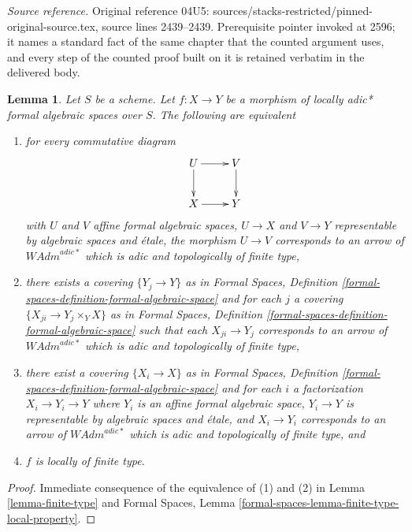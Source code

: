 \documentclass[10pt,a4paper]{amsart}
\theoremstyle{plain}
\newtheorem{lemma}[subsection]{Lemma}
\theoremstyle{definition}
\theoremstyle{remark}
\numberwithin{equation}{subsection}
\begin{document}
\noindent\textit{Source reference.} Original reference 04U5: sources/stacks-restricted/pinned-original-source.tex, source lines 2439--2439. Prerequisite pointer invoked at 2596; it names a standard fact of the same chapter that the counted argument uses, and every step of the counted proof built on it is retained verbatim in the delivered body.\par\medskip
\begin{lemma}
\label{lemma-finite-type-morphisms}
Let $S$ be a scheme. Let $f : X \to Y$ be a morphism of
locally adic* formal algebraic spaces over $S$.
The following are equivalent
\begin{enumerate}
\item for every commutative diagram
$$
\xymatrix{
U \ar[d] \ar[r] & V \ar[d] \\
X \ar[r] & Y
}
$$
with $U$ and $V$ affine formal algebraic spaces, $U \to X$ and $V \to Y$
representable by algebraic spaces and \'etale, the morphism $U \to V$
corresponds to an arrow of $\textit{WAdm}^{adic*}$ which is
adic and topologically of finite type,
\item there exists a covering $\{Y_j \to Y\}$ as in
Formal Spaces,
Definition \ref{formal-spaces-definition-formal-algebraic-space}
and for each $j$
a covering $\{X_{ji} \to Y_j \times_Y X\}$ as in
Formal Spaces,
Definition \ref{formal-spaces-definition-formal-algebraic-space}
such that each $X_{ji} \to Y_j$  corresponds
to an arrow of $\textit{WAdm}^{adic*}$ which is adic and
topologically of finite type,
\item there exist a covering $\{X_i \to X\}$ as in
Formal Spaces,
Definition \ref{formal-spaces-definition-formal-algebraic-space}
and for each $i$ a factorization $X_i \to Y_i \to Y$ where $Y_i$
is an affine formal algebraic space, $Y_i \to Y$ is representable
by algebraic spaces and \'etale, and $X_i \to Y_i$ corresponds
to an arrow of $\textit{WAdm}^{adic*}$ which is adic and topologically
of finite type, and
\item $f$ is locally of finite type.
\end{enumerate}
\end{lemma}

\begin{proof}
Immediate consequence of the equivalence of (1) and (2) in
Lemma \ref{lemma-finite-type} and
Formal Spaces, Lemma
\ref{formal-spaces-lemma-finite-type-local-property}.
\end{proof}
\end{document}

